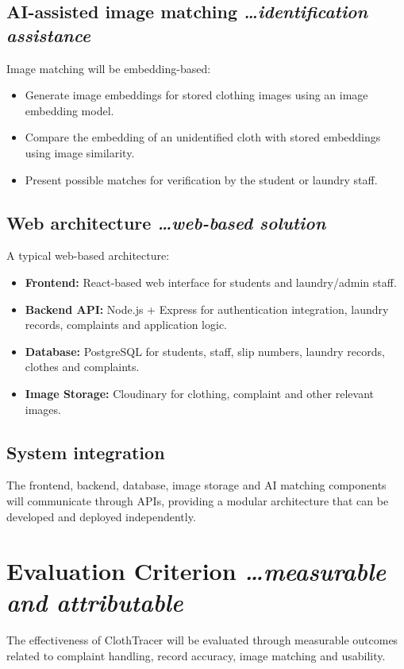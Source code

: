 \documentclass[11pt,a4paper]{article}
\newcommand{\BvrHint}[1]{%
  {\normalfont\normalsize\itshape\hfill #1}}
\begin{document}
\subsection{AI-assisted image matching %
\BvrHint{\ldots identification assistance}}
Image matching will be embedding-based:
\begin{itemize}[leftmargin=0.7cm]
    \item Generate image embeddings for stored clothing images using an image embedding model.
    \item Compare the embedding of an unidentified cloth with stored embeddings using image similarity.
    \item Present possible matches for verification by the student or laundry staff.
\end{itemize}

\subsection{Web architecture %
\BvrHint{\ldots web-based solution}}
A typical web-based architecture:
\begin{itemize}[leftmargin=0.7cm]
    \item \textbf{Frontend:} React-based web interface for students and laundry/admin staff.
    \item \textbf{Backend API:} Node.js + Express for authentication integration, laundry records, complaints and application logic.
    \item \textbf{Database:} PostgreSQL for students, staff, slip numbers, laundry records, clothes and complaints.
    \item \textbf{Image Storage:} Cloudinary for clothing, complaint and other relevant images.
\end{itemize}

\subsection{System integration}
The frontend, backend, database, image storage and AI matching components will communicate through APIs, providing a modular architecture that can be developed and deployed independently.

\section{Evaluation Criterion %
\BvrHint{\ldots measurable and attributable}}

The effectiveness of ClothTracer will be evaluated through measurable outcomes related to complaint handling, record accuracy, image matching and usability.
\end{document}
